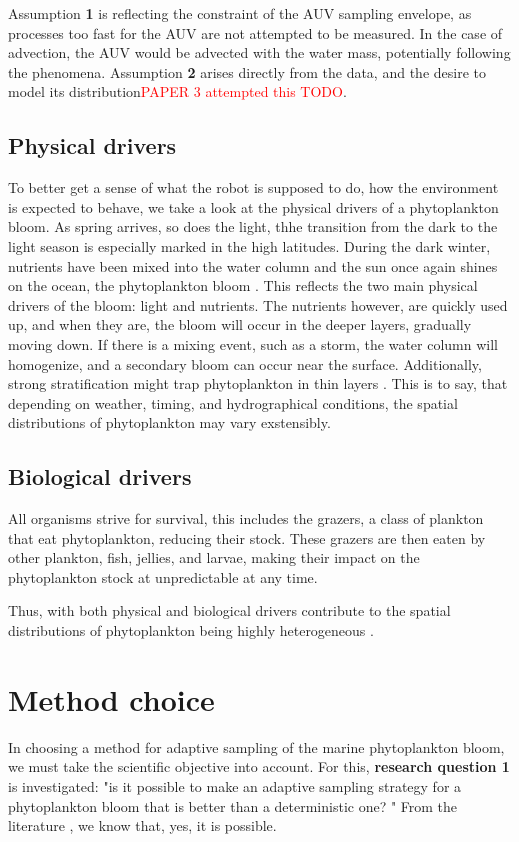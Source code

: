 Assumption \textbf{1} is reflecting the constraint of the AUV sampling envelope, as processes too fast for the AUV are not attempted to be measured. In the case of advection, the AUV would be advected with the water mass, potentially following the phenomena. Assumption \textbf{2} arises directly from the data, and the desire to model its distribution\cite{low2009multi,kemna2016adaptive,kemna2018multi}\textcolor{red}{PAPER 3 attempted this TODO}.  
\subsection{Physical drivers}
To better get a sense of what the robot is supposed to do, how the environment is expected to behave, we take a look at the physical drivers of a phytoplankton bloom. As spring arrives, so does the light, thhe transition from the dark to the light season is especially marked in the high latitudes. During the dark winter, nutrients have been mixed into the water column and the sun once again shines on the ocean, the phytoplankton bloom \cite{sakshaug2009ecosystem}. This reflects the two main physical drivers of the bloom: light and nutrients. The nutrients however, are quickly used up, and when they are, the bloom will occur in the deeper layers, gradually moving down. If there is a mixing event, such as a storm, the water column will homogenize, and a secondary bloom can occur near the surface. Additionally, strong stratification might trap phytoplankton in thin layers \cite{durham2012thin}. This is to say, that depending on weather, timing, and hydrographical conditions, the spatial distributions of phytoplankton may vary exstensibly. 

\subsection{Biological drivers}
All organisms strive for survival, this includes the grazers, a class of plankton that eat phytoplankton, reducing their stock. These grazers are then eaten by other plankton, fish, jellies, and larvae, making their impact on the phytoplankton stock at unpredictable at any time.  

Thus, with both physical and biological drivers contribute to the spatial distributions of phytoplankton being highly heterogeneous \cite{grunbaum2012logic}. 



\section{Method choice}
In choosing a method for adaptive sampling of the marine phytoplankton bloom, we must take the scientific objective into account. For this, \textbf{research question 1} is investigated: "is it possible to make an adaptive sampling strategy for a phytoplankton bloom that is better than a deterministic one? " From the literature \cite{frolov2014can}, we know that, yes, it is possible.

